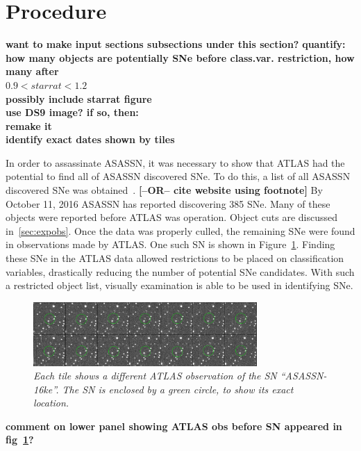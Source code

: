 \documentclass[aps,prb,twocolumn,superscriptaddress]{revtex4-1}
\begin{document}
\section{Procedure}
{\bf want to make input sections subsections under this section?}
{\bf quantify: how many objects are potentially SNe before class.var. restriction, how many after\\
$0.9 < starrat < 1.2$\\}
{\bf possibly include starrat figure\\
use DS9 image? if so, then:\\
\indent remake it\\
\indent identify exact dates shown by tiles}

\indent In order to assassinate ASASSN, 
it was necessary to show that ATLAS had the potential to find all of ASASSN discovered SNe. 
To do this, a list of all ASASSN discovered SNe was obtained~\cite{asn_data}. 
{\bf [--OR-- cite website using footnote]}
By October 11, 2016 
ASASSN has reported discovering 385 SNe. Many of these 
objects were reported before ATLAS was operation. Object cuts are discussed 
in~\cref{sec:expobs}. Once the data was properly culled, the remaining SNe 
were found in observations made by ATLAS. 
One such SN is shown in Figure~\ref{fig:ds9_ASASSN-16ke}.
Finding these SNe in the ATLAS 
data allowed restrictions to be placed on classification variables, drastically 
reducing the number of potential SNe candidates. With such a restricted object 
list, visually examination is able to be used in identifying SNe.\\ 


\begin{figure}[H]%
   \begin{center}
 \centerline{\includegraphics[width=3.35in]{figures/ds9_asn16ke.png}}
 \caption{\it \small{Each tile shows a different ATLAS observation of the SN ``ASASSN-16ke''. The SN is enclosed by a green circle, to show its exact location. \label{fig:ds9_ASASSN-16ke}}}
   \end{center}
\end{figure}
{\bf comment on lower panel showing ATLAS obs before SN appeared in fig~\ref{fig:ds9_ASASSN-16ke}?}
\end{document}
